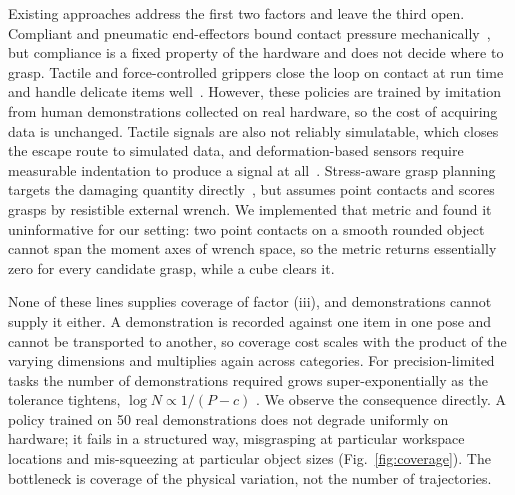 Existing approaches address the first two factors and leave the third open. Compliant and
pneumatic end-effectors bound contact pressure mechanically~\cite{wang2024softgripper}, but
compliance is a fixed property of the hardware and does not decide where to grasp. Tactile
and force-controlled grippers close the loop on contact at run time and handle delicate items
well~\cite{kang2026learning,vtam}. However, these policies are trained by imitation from human
demonstrations collected on real hardware, so the cost of acquiring data is unchanged.
Tactile signals are also not reliably simulatable, which closes the escape route to simulated
data, and deformation-based sensors require measurable indentation to produce a signal at
all~\cite{lighttact}. Stress-aware grasp planning targets the damaging quantity
directly~\cite{pan2020stressmin}, but assumes point contacts and scores grasps by resistible
external wrench. We implemented that metric and found it uninformative for our setting: two
point contacts on a smooth rounded object cannot span the moment axes of wrench space, so the
metric returns essentially zero for every candidate grasp, while a cube clears it.

None of these lines supplies coverage of factor (iii), and demonstrations cannot supply it
either. A demonstration is recorded against one item in one pose and cannot be transported to
another, so coverage cost scales with the product of the varying dimensions and multiplies
again across categories. For precision-limited tasks the number of demonstrations required
grows super-exponentially as the tolerance tightens, $\log N \propto 1/(P-c)$
\cite{curseofprecision}. We observe the consequence directly. A policy trained on 50 real
demonstrations does not degrade uniformly on hardware; it fails in a structured way,
misgrasping at particular workspace locations and mis-squeezing at particular object sizes
(Fig.~\ref{fig:coverage}). The bottleneck is coverage of the physical variation, not the
number of trajectories.


